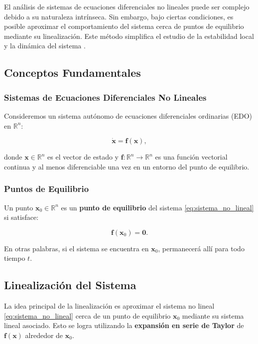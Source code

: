 El análisis de sistemas de ecuaciones diferenciales no lineales puede ser complejo debido a su naturaleza intrínseca. Sin embargo, bajo ciertas condiciones, es posible aproximar el comportamiento del sistema cerca de puntos de equilibrio mediante su linealización. Este método simplifica el estudio de la estabilidad local y la dinámica del sistema \cite{perko2001differential}.

\subsection{Conceptos Fundamentales}

\subsubsection{Sistemas de Ecuaciones Diferenciales No Lineales}

Consideremos un sistema autónomo de ecuaciones diferenciales ordinarias (EDO) en $\mathbb{R}^n$:

\begin{equation}\label{eq:sistema_no_lineal}
    \dot{\mathbf{x}} = \mathbf{f}(\mathbf{x}),
\end{equation}

donde $\mathbf{x} \in \mathbb{R}^n$ es el vector de estado y $\mathbf{f}: \mathbb{R}^n \to \mathbb{R}^n$ es una función vectorial continua y al menos diferenciable una vez en un entorno del punto de equilibrio.

\subsubsection{Puntos de Equilibrio}

Un punto $\mathbf{x}_0 \in \mathbb{R}^n$ es un \textbf{punto de equilibrio} del sistema \eqref{eq:sistema_no_lineal} si satisface:

\begin{equation}
    \mathbf{f}(\mathbf{x}_0) = \mathbf{0}.
\end{equation}

En otras palabras, si el sistema se encuentra en $\mathbf{x}_0$, permanecerá allí para todo tiempo $t$.

\subsection{Linealización del Sistema}

La idea principal de la linealización es aproximar el sistema no lineal \eqref{eq:sistema_no_lineal} cerca de un punto de equilibrio $\mathbf{x}_0$ mediante su sistema lineal asociado. Esto se logra utilizando la \textbf{expansión en serie de Taylor} de $\mathbf{f}(\mathbf{x})$ alrededor de $\mathbf{x}_0$.

